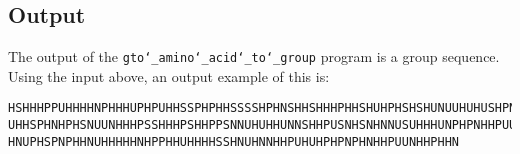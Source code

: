 \subsection*{Output}

The output of the \texttt{gto\char`_amino\char`_acid\char`_to\char`_group} program is a group sequence.\\
Using the input above, an output example of this is:
\begin{lstlisting}
HSHHHPPUHHHHNPHHHUPHPUHHSSPHPHHSSSSHPHNSHHSHHHPHHSHUHPHSHSHUNUUHUHUSHPNHUHUSUUHS
UHHSPHNHPHSNUUNHHHPSSHHHPSHHPPSNNUHUHHUNNSHHPUSNHSNHNNUSUHHHUNPHPNHHPUUUSPHHHSUH
HNUPHSPNPHHNUHHHHHNHPPHHUHHHHSSHNUHNNHHPUHUHPHPNPHNHHPUUNHHPHHN
\end{lstlisting}
